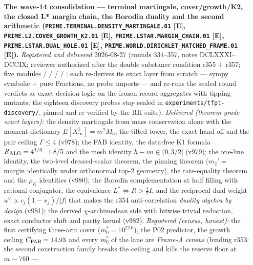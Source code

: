 \par\smallskip\noindent\textbf{The wave-14 consolidation --- terminal
martingale, cover/growth/K2, the closed L* margin chain, the Borodin
duality and the second arithmetic
(\texttt{PRIME.TERMINAL.\allowbreak DENSITY\_MARTINGALE.01} [E],
\texttt{PRIME.L2.\allowbreak COVER\_GROWTH\_K2.01} [E],
\texttt{PRIME.LSTAR.\allowbreak MARGIN\_CHAIN.01} [E],
\texttt{PRIME.LSTAR.\allowbreak DUAL\_HOLE.01} [E],
\texttt{PRIME.WORLD.\allowbreak DIRICHLET\_MATCHED\_FRAME.01} [E]).}
{\sloppy
\emph{Registered and delivered} 2026-08-27 (rounds 334--357, notes
DCLXXXI--DCCIX; reviewer-authorized after the double substance
condition r355 $+$ r357; five modules
 /
 /
 /
 /
; each re-derives its exact
layer from scratch --- sympy symbolic $+$ pure Fractions, no probe
imports --- and re-runs the sealed round verdicts as exact decision
logic on the frozen record aggregates with tipping mutants; the
eighteen discovery probes stay sealed in
\texttt{experiments/tfpt-discovery/}, pinned and re-verified by the
RH suite).  \emph{Delivered (theorem-grade exact layers):} the
density martingale from mass conservation alone with the moment
dictionary $E[X_\infty^3] = m^2 M_3$, the tilted tower, the exact
hand-off and the pair ceiling $\Gamma \le 4$ (v978); the FAB
identity, the data-free K1 formula $R_{\rm ALG} = 4^{1/3} \to 8/5$
and the mesh identity $h - \nu u \in (0, 3/2]$ (v979); the one-line
identity, the two-level dressed-scalar theorem, the pinning theorem
($m_2' = $ margin identically under orthonormal top-2 geometry),
the rate-equality theorem and the $\rho_K$ identities (v980); the
Borodin complementation at half filling with rational conjugator,
the equivalence $L^* \Leftrightarrow R > \tfrac12 I$, and the
reciprocal dual weight $u^\vee \propto c_j(1-x_j)/|f|$ that makes
the r354 anti-correlation \emph{duality algebra by design} (v981);
the derived $\chi$-archimedean side with bitwise trivial reduction,
exact conductor shift and parity kernel (v982).  \emph{Registered
(census, honest):} the first certifying three-arm cover
($m_0^* = 10^{22.6}$), the P02 predictor, the growth ceiling
$C_{\rm FAB} = 14.93$ and every $m_0^*$ of the lane are
\emph{Frame-A census} (binding r353: the second construction family
breaks the ceiling and kills the reserve floor at $m \sim 760$ ---
}
